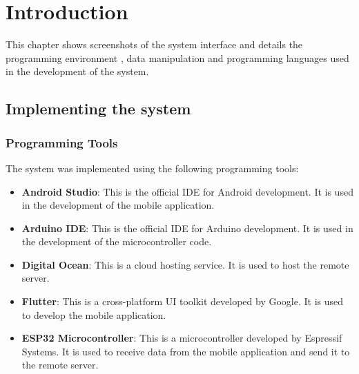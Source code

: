 \section{Introduction}\label{sec:introduction}
This chapter shows screenshots of the system interface and details the programming environment , data manipulation and programming languages used in the development of the system.

\subsection{Implementing the system}

\subsubsection{Programming Tools}
The system was implemented using the following programming tools:
\begin{itemize}
    \item \textbf{Android Studio}: This is the official IDE for Android development. It is used in the development of the mobile application.
    \item \textbf{Arduino IDE}: This is the official IDE for Arduino development. It is used in the development of the microcontroller code.
    \item \textbf{Digital Ocean}: This is a cloud hosting service. It is used to host the remote server.
    \item \textbf{Flutter}: This is a cross-platform UI toolkit developed by Google. It is used to develop the mobile application.
    \item \textbf{ESP32 Microcontroller}: This is a microcontroller developed by Espressif Systems. It is used to receive data from the mobile application and send it to the remote server.
\end{itemize}

